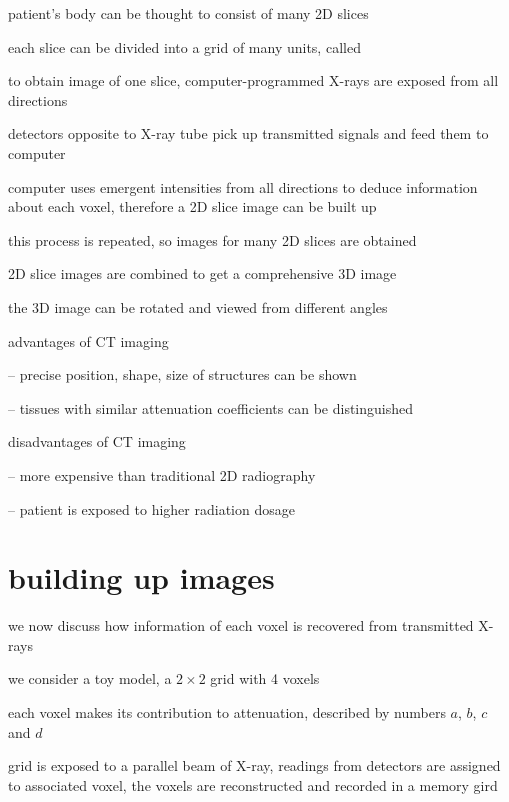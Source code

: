 patient's body can be thought to consist of many 2D slices

each slice can be divided into a grid of many units, called 

to obtain image of one slice, computer-programmed X-rays are exposed from all directions

detectors opposite to X-ray tube pick up transmitted signals and feed them to computer

computer uses emergent intensities from all directions to deduce information about each voxel, therefore a 2D slice image can be built up

this process is repeated, so images for many 2D slices are obtained

2D slice images are combined to get a comprehensive 3D image

the 3D image can be rotated and viewed from different angles

\cmt advantages of CT imaging

\begin{compactitem}
	\item[--] precise position, shape, size of structures can be shown
	
	\item[--] tissues with similar attenuation coefficients can be distinguished

\end{compactitem}

\cmt disadvantages of CT imaging

\begin{compactitem}
	\item[--] more expensive than traditional 2D radiography
	
	\item[--] patient is exposed to higher radiation dosage
\end{compactitem}

\section*{building up images}

we now discuss how information of each voxel is recovered from transmitted X-rays

we consider a toy model, a $2\times2$ grid with 4 voxels

each voxel makes its contribution to attenuation, described by numbers $a$, $b$, $c$ and $d$

grid is exposed to a parallel beam of X-ray, readings from detectors are assigned to associated voxel, the voxels are reconstructed and recorded in a memory gird

